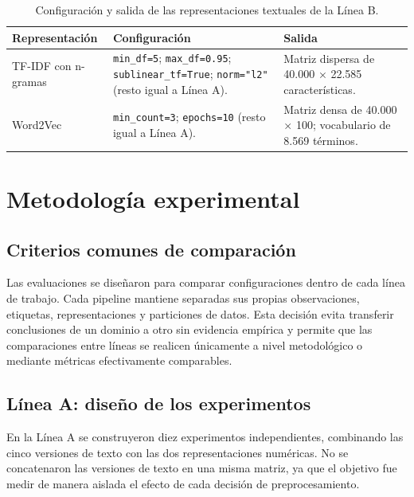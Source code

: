 \documentclass[12pt,a4paper]{article}
\newcommand{\code}[1]{\nolinkurl{#1}}
\begin{document}
\begin{table}[htbp]
\centering
\caption{Configuración y salida de las representaciones textuales de la Línea B.}
\label{tab:representaciones_b}
\small
\begin{tabularx}{\textwidth}{@{}P{3.4cm}P{4.7cm}Y@{}}
\toprule
\textbf{Representación} & \textbf{Configuración} & \textbf{Salida} \\
\midrule
TF-IDF con n-gramas & \code{min\_df=5}; \code{max\_df=0.95}; \code{sublinear\_tf=True}; \code{norm="l2"} (resto igual a Línea A). & Matriz dispersa de 40.000 × 22.585 características. \\
\addlinespace
Word2Vec & \code{min\_count=3}; \code{epochs=10} (resto igual a Línea A). & Matriz densa de 40.000 × 100; vocabulario de 8.569 términos. \\
\bottomrule
\end{tabularx}
\end{table}
\FloatBarrier

\section{Metodología experimental}

\subsection{Criterios comunes de comparación}

Las evaluaciones se diseñaron para comparar configuraciones dentro de cada línea de trabajo. Cada pipeline mantiene separadas sus propias observaciones, etiquetas, representaciones y particiones de datos. Esta decisión evita transferir conclusiones de un dominio a otro sin evidencia empírica y permite que las comparaciones entre líneas se realicen únicamente a nivel metodológico o mediante métricas efectivamente comparables.

\subsection{Línea A: diseño de los experimentos}

En la Línea A se construyeron diez experimentos independientes, combinando las cinco versiones de texto con las dos representaciones numéricas. No se concatenaron las versiones de texto en una misma matriz, ya que el objetivo fue medir de manera aislada el efecto de cada decisión de preprocesamiento.
\end{document}

